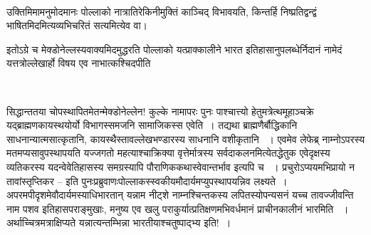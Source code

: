 \begin{myquote}

~\hfill {}
\end{myquote}

उक्तिमिमामनुमोदमानः पोल्लाको नात्रातिरेकिनीमुक्तिं काञ्चिद् विभावयति, किन्तर्हि निष्प्रतिद्वन्द्वं भाषितमिदमित्यव्यभिचरितं सत्यमित्येव वा।

इतोऽग्रे च मेक्डोनेल्लस्यवाक्यमिदमुद्धरति पोल्लाको यत्प्राक्कालीने भारत इतिहासानुपलब्धेर्निदानं नामेदं यत्तत्रोल्लेखार्हो विषय एव नाभात्कश्चिदपीति

\begin{myquote}

~\hfill {}
\end{myquote}

सिद्धान्ततया चोपस्थापितमेतन्मेक्डोनेल्लेन! कुल्के  नामापरः पुनः पाश्चात्त्यो हेतुमत्रेत्थमूहाञ्चक्रे यद्ब्राह्मणकायस्थयोर्यो विभागस्समजनि सामाजिकस्स एवेति~। तद्यथा ब्राह्मणैर्बौद्धिकानि साधनान्यात्मसात्कृतानि, कायस्थैस्तावल्लेखभण्डारस्य  साधनानि वशीकृतानि ~। एवमेव लेफेब्र्  नाम्नोऽपरस्य मतमप्यसावुपस्थापयति यज्जगतो महत्याश्चाक्रिक्या वृत्तेर्मात्रस्य सर्वदाकलनमित्येतद्धेतुक एवेदृक्षस्य व्यतिकरस्य यदन्वेवेतिहासस्य समग्रस्यापि पौराणिककथास्वेवान्तर्भाव इत्यपि च ~। प्रचुरोऽप्ययमभिप्रायो न तावांस्तृप्तिकर – इति पुनःप्रब्रुवाणःपोल्लाकस्स्वकीयमौदार्यमप्युपस्थापयन्निव लक्ष्यते~। अपरमपीदृशमेवौदार्यमस्याधिभारतान् यन्नाम नीट्शे नाम्नश्चिन्तकस्य लपितस्योपन्यसनं यच्च तावज्जीवन्ति नाम पशव इतिहासपराङ्मुखाः, मनुष्य एव खलु पराकुर्यात्प्रतिक्षणमभिवर्धमानं प्राचीनकालीनं भारमिति ~। अर्थाच्चित्रमत्राक्षिप्यते यन्नात्यन्तम्भिन्ना भारतीयाश्चतुष्पाद्भ्य इति!~।

\vspace{-.3cm}

